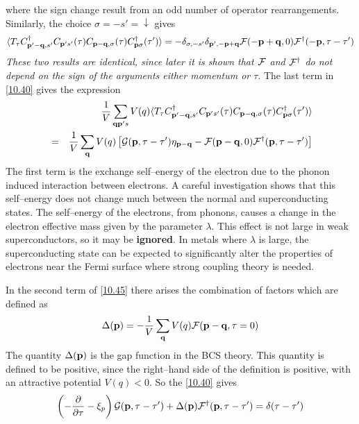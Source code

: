 where the sign change result from an odd number of operator rearrangements.
Similarly, the choice $\sigma = - s' = \downarrow$ gives
\begin{equation}
    \langle T_\tau C^\dagger_{\mathbf{p}'-\mathbf{q},s'} C_{\mathbf{p}'s'}(\tau) C_{\mathbf{p}-\mathbf{q},\sigma}(\tau) C^\dagger_{\mathbf{p}\sigma}(\tau') \rangle = - \delta_{\sigma,-s'} \delta_{\mathbf{p}',-\mathbf{p}+\mathbf{q}} \mathcal{F}(-\mathbf{p}+\mathbf{q},0) \mathcal{F}^\dagger(-\mathbf{p},\tau-\tau') \label{10.44}
\end{equation}
\textit{These two results are identical, since later it is shown that $\mathcal{F}$ and $\mathcal{F}^\dagger$ do not depend on the sign of the arguments either momentum or $\tau$}.
The last term in \eqref{10.40} gives the expression
\begin{eqnarray}\label{10.45}
    &~& \frac{1}{V} \sum_{\mathbf{q}\mathbf{p}'s} V(q)  \langle T_\tau C^\dagger_{\mathbf{p}'-\mathbf{q},s'} C_{\mathbf{p}'s'}(\tau) C_{\mathbf{p}-\mathbf{q},\sigma}(\tau) C^\dagger_{\mathbf{p}\sigma}(\tau') \rangle    \\ 
    &=& \frac{1}{V} \sum_{\mathbf{q}} V(q) \left[\mathcal{G}(\mathbf{p},\tau-\tau')\eta_{\mathbf{p}-\mathbf{q}} - \mathcal{F}(\mathbf{p}-\mathbf{q},0)\mathcal{F}^\dagger(\mathbf{p},\tau-\tau') \right] \nonumber
\end{eqnarray}
The first term is the exchange self--energy of the electron due to the phonon induced interaction between electrons.
A careful investigation shows that this self--energy does not change much between the normal and superconducting states.
The self--energy of the electrons, from phonons, causes a change in the electron effective mass given by the parameter $\lambda$.
This effect is not large in weak superconductors, so it may be \textbf{ignored}.
In metals where $\lambda$ is large, the superconducting state can be expected to significantly alter the properties of electrons near the Fermi surface where strong coupling theory is needed.

In the second term of \eqref{10.45} there arises the combination of factors which are defined as
\begin{equation}
    \Delta (\mathbf{p}) = - \frac{1}{V} \sum_{\mathbf{q}} V(q) \mathcal{F}(\mathbf{p}-\mathbf{q},\tau=0)  \label{10.46}
\end{equation}
The quantity $\Delta(\mathbf{p})$ is the gap function in the BCS theory.
This quantity is defined to be positive, since the right--hand side of the definition is positive, with an attractive potential $V(q)<0$.
So the \eqref{10.40} gives
\begin{equation}
    \left( - \frac{\partial}{\partial \tau} - \xi_p \right) \mathcal{G}(\mathbf{p},\tau-\tau') + \Delta(\mathbf{p}) \mathcal{F}^\dagger (\mathbf{p},\tau-\tau') = \delta(\tau-\tau') \label{10.47}
\end{equation}

